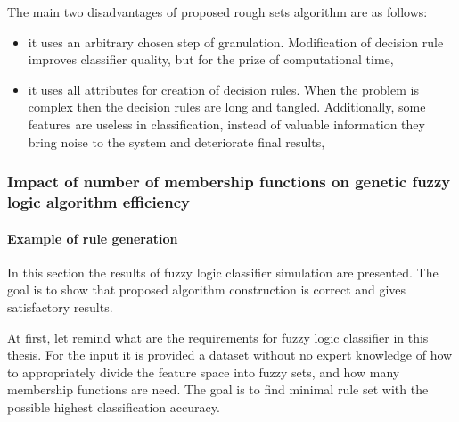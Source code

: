 The main two disadvantages of proposed rough sets algorithm are as follows:
\begin{itemize}
    \item it uses an arbitrary chosen step of granulation. Modification of
        decision rule improves classifier quality, but for the prize of
        computational time,
    \item it uses all attributes for creation of decision rules. When the
        problem is complex then the decision rules are long and tangled. 
        Additionally, some features are useless in classification, instead of valuable
        information they bring noise to the system and deteriorate final
        results,
\end{itemize}

\subsubsection{Impact of number of membership functions on genetic fuzzy logic algorithm efficiency}
\label{cha:Simulation_reaearch_3}
\paragraph{Example of rule generation}
In this section the results of fuzzy logic classifier simulation are presented.
The goal is to show that proposed algorithm construction is correct and gives
satisfactory results. 

At first, let remind what are the requirements for fuzzy logic classifier in
this thesis. For the input it is provided a dataset without no expert knowledge 
of how to appropriately divide the feature space into fuzzy sets, and how many membership
functions are need. The goal is to find minimal rule set with the possible highest
classification accuracy. 

